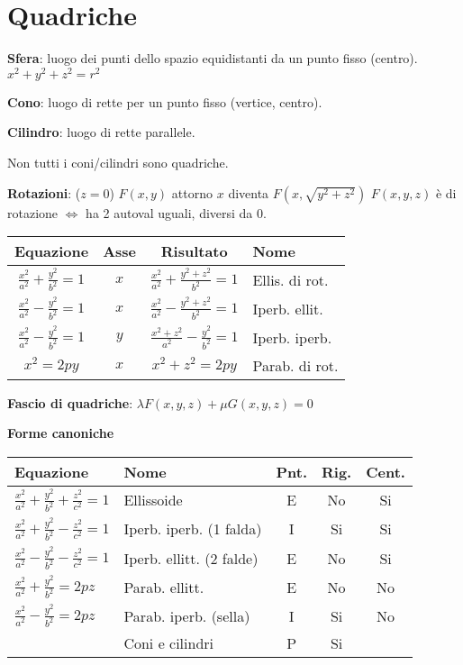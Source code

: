\section{Quadriche}

\textbf{Sfera}: luogo dei punti dello spazio equidistanti da un punto fisso (centro). $x^2+y^2+z^2=r^2$

\textbf{Cono}: luogo di rette per un punto fisso (vertice, centro).

\textbf{Cilindro}: luogo di rette parallele.

Non tutti i coni/cilindri sono quadriche.

\textbf{Rotazioni}: ($z = 0$) $F(x, y)$ attorno $x$ diventa $F(x, \sqrt{y^2+z^2})$
$F(x,y,z)$ è di rotazione $\Leftrightarrow$ ha 2 autoval uguali, diversi da 0.

\begin{tabular}{cccl}
	\textbf{Equazione} & \textbf{Asse} & \textbf{Risultato} & \textbf{Nome} \\
	\hline
	$\frac{x^2}{a^2}+\frac{y^2}{b^2}=1$ & $x$ & $\frac{x^2}{a^2}+\frac{y^2+z^2}{b^2}=1$ & Ellis. di rot. \\
	$\frac{x^2}{a^2}-\frac{y^2}{b^2}=1$ & $x$ & $\frac{x^2}{a^2}-\frac{y^2+z^2}{b^2}=1$ & Iperb. ellit. \\
	$\frac{x^2}{a^2}-\frac{y^2}{b^2}=1$ & $y$ & $\frac{x^2+z^2}{a^2}-\frac{y^2}{b^2}=1$ & Iperb. iperb. \\
	$x^2=2py$ & $x$ & $x^2+z^2=2py$ & Parab. di rot.
\end{tabular}

\textbf{Fascio di quadriche}: $\lambda F(x, y, z) + \mu G(x, y, z) = 0$

\textbf{Forme canoniche}
\setlength{\tabcolsep}{0.2em}%
\begin{tabular}{llccc}
	\textbf{Equazione} & \textbf{Nome} & \textbf{Pnt.} & \textbf{Rig.} & \textbf{Cent.} \\
	\hline
	$\frac{x^2}{a^2} + \frac{y^2}{b^2} + \frac{z^2}{c^2} = 1$ & Ellissoide & E & No & Si \\
	$\frac{x^2}{a^2} + \frac{y^2}{b^2} - \frac{z^2}{c^2} = 1$ & Iperb. iperb. (1 falda) & I & Si & Si \\
	$\frac{x^2}{a^2} - \frac{y^2}{b^2} - \frac{z^2}{c^2} = 1$ & Iperb. ellitt. (2 falde) & E & No & Si \\
	$\frac{x^2}{a^2} + \frac{y^2}{b^2} = 2pz$ & Parab. ellitt. & E & No & No \\
	$\frac{x^2}{a^2} - \frac{y^2}{b^2} = 2pz$ & Parab. iperb. (sella) & I & Si & No \\
	 & Coni e cilindri & P & Si & \\
\end{tabular}

